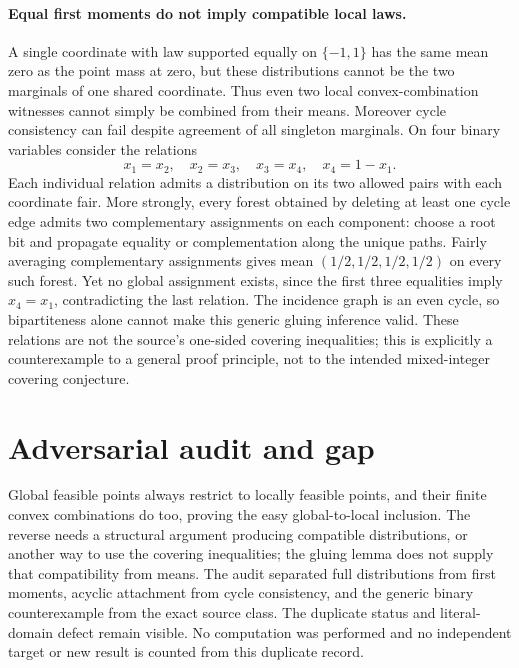 \documentclass[11pt]{article}
\begin{document}
\paragraph{Equal first moments do not imply compatible local laws.}
A single coordinate with law supported equally on $\{-1,1\}$ has the
same mean zero as the point mass at zero, but these distributions cannot be
the two marginals of one shared coordinate. Thus even two local
convex-combination witnesses cannot simply be combined from their means.
Moreover cycle consistency can fail despite agreement of all singleton
marginals. On four binary variables consider the relations
\[
x_1=x_2,\quad x_2=x_3,\quad x_3=x_4,\quad x_4=1-x_1.
\]
Each individual relation admits a distribution on its two allowed pairs
with each coordinate fair. More strongly, every forest obtained by deleting
at least one cycle edge admits two complementary assignments on each
component: choose a root bit and propagate equality or complementation
along the unique paths. Fairly averaging complementary assignments gives
mean $(1/2,1/2,1/2,1/2)$ on every such forest.
Yet no global assignment exists, since the first three equalities imply
$x_4=x_1$, contradicting the last relation. The incidence graph is an
even cycle, so bipartiteness alone cannot make this generic gluing inference
valid. These relations are not the source's one-sided covering inequalities;
this is explicitly a counterexample to a general proof principle, not to
the intended mixed-integer covering conjecture.

\section{Adversarial audit and gap}
Global feasible points always restrict to locally feasible points, and their
finite convex combinations do too, proving the easy global-to-local inclusion.
The reverse needs a structural argument producing compatible distributions,
or another way to use the covering inequalities; the gluing lemma does not
supply that compatibility from means. The audit separated full distributions
from first moments, acyclic attachment from cycle consistency, and the generic
binary counterexample from the exact source class. The duplicate status and
literal-domain defect remain visible. No computation was performed and no
independent target or new result is counted from this duplicate record.
\end{document}
